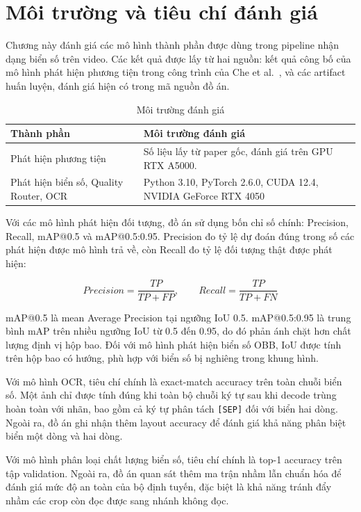 \documentclass[../DoAn.tex]{subfiles}
\begin{document}
\section{Môi trường và tiêu chí đánh giá}
\label{section:5.1}

Chương này đánh giá các mô hình thành phần được dùng trong pipeline nhận dạng biển số trên video. Các kết quả được lấy từ hai nguồn: kết quả công bố của mô hình phát hiện phương tiện trong công trình của Che et al.~\cite{che2023ctm}, và các artifact huấn luyện, đánh giá hiện có trong mã nguồn đồ án.

\begin{table}[htbp]
\centering
\caption{Môi trường đánh giá}
\label{tab:experiment-environment}
\begin{tabular}{|p{4.0cm}|p{10.2cm}|}
\hline
\textbf{Thành phần} & \textbf{Môi trường đánh giá} \\
\hline
Phát hiện phương tiện & Số liệu lấy từ paper gốc, đánh giá trên GPU RTX A5000. \\
\hline
Phát hiện biển số, Quality Router, OCR & Python 3.10, PyTorch 2.6.0, CUDA 12.4, NVIDIA GeForce RTX 4050 \\
\hline
\end{tabular}
\end{table}

Với các mô hình phát hiện đối tượng, đồ án sử dụng bốn chỉ số chính: Precision, Recall, mAP@0.5 và mAP@0.5:0.95. Precision đo tỷ lệ dự đoán đúng trong số các phát hiện được mô hình trả về, còn Recall đo tỷ lệ đối tượng thật được phát hiện:

\[
Precision = \frac{TP}{TP + FP}, \qquad Recall = \frac{TP}{TP + FN}
\]

mAP@0.5 là mean Average Precision tại ngưỡng IoU 0.5. mAP@0.5:0.95 là trung bình mAP trên nhiều ngưỡng IoU từ 0.5 đến 0.95, do đó phản ánh chặt hơn chất lượng định vị hộp bao. Đối với mô hình phát hiện biển số OBB, IoU được tính trên hộp bao có hướng, phù hợp với biển số bị nghiêng trong khung hình.

Với mô hình OCR, tiêu chí chính là exact-match accuracy trên toàn chuỗi biển số. Một ảnh chỉ được tính đúng khi toàn bộ chuỗi ký tự sau khi decode trùng hoàn toàn với nhãn, bao gồm cả ký tự phân tách \texttt{[SEP]} đối với biển hai dòng. Ngoài ra, đồ án ghi nhận thêm layout accuracy để đánh giá khả năng phân biệt biển một dòng và hai dòng.

Với mô hình phân loại chất lượng biển số, tiêu chí chính là top-1 accuracy trên tập validation. Ngoài ra, đồ án quan sát thêm ma trận nhầm lẫn chuẩn hóa để đánh giá mức độ an toàn của bộ định tuyến, đặc biệt là khả năng tránh đẩy nhầm các crop còn đọc được sang nhánh không đọc.
\end{document}
